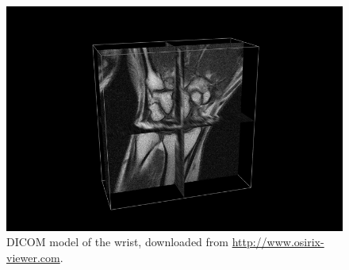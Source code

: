 \begin{figure}[ht]
   \centering
   \includegraphics[width=\imglength]{images/dicom_wrist}
   \caption{DICOM model of the wrist, downloaded from \url{http://www.osirix-viewer.com}.
   \label{fig:dicom:wrist}}
\end{figure}
